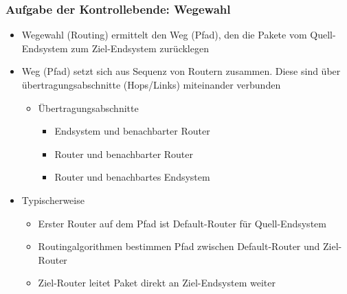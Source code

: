     \subsubsection{Aufgabe der Kontrollebende: Wegewahl}
      \begin{itemize}
        \item Wegewahl (Routing) ermittelt den Weg (Pfad), den die Pakete vom Quell-Endsystem zum
          Ziel-Endsystem zurücklegen
        \item Weg (Pfad) setzt sich aus Sequenz von Routern zusammen. Diese sind über
          übertragungsabschnitte (Hops/Links) miteinander verbunden
          \begin{itemize}
            \item Übertragungsabschnitte
              \begin{itemize}
                \item Endsystem und benachbarter Router
                \item Router und benachbarter Router
                \item Router und benachbartes Endsystem
              \end{itemize}
          \end{itemize}
        \item Typischerweise
          \begin{itemize}
            \item Erster Router auf dem Pfad ist Default-Router für Quell-Endsystem
            \item Routingalgorithmen bestimmen Pfad zwischen Default-Router und Ziel-Router
            \item Ziel-Router leitet Paket direkt an Ziel-Endsystem weiter
          \end{itemize}
      \end{itemize}
